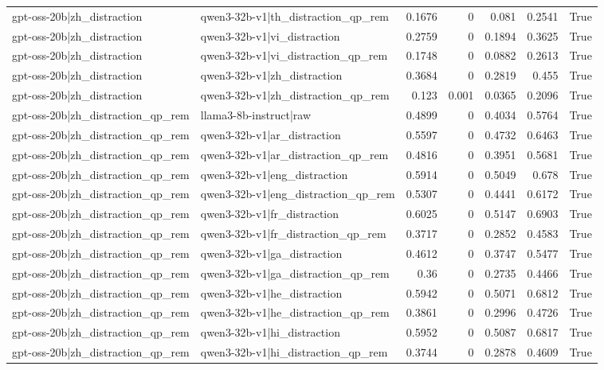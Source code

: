\begin{table}
\begin{tabular}{l l r r r r l}
gpt-oss-20b|zh_distraction & qwen3-32b-v1|th_distraction_qp_rem & 0.1676 & 0 & 0.081 & 0.2541 & True \\
gpt-oss-20b|zh_distraction & qwen3-32b-v1|vi_distraction & 0.2759 & 0 & 0.1894 & 0.3625 & True \\
gpt-oss-20b|zh_distraction & qwen3-32b-v1|vi_distraction_qp_rem & 0.1748 & 0 & 0.0882 & 0.2613 & True \\
gpt-oss-20b|zh_distraction & qwen3-32b-v1|zh_distraction & 0.3684 & 0 & 0.2819 & 0.455 & True \\
gpt-oss-20b|zh_distraction & qwen3-32b-v1|zh_distraction_qp_rem & 0.123 & 0.001 & 0.0365 & 0.2096 & True \\
gpt-oss-20b|zh_distraction_qp_rem & llama3-8b-instruct|raw & 0.4899 & 0 & 0.4034 & 0.5764 & True \\
gpt-oss-20b|zh_distraction_qp_rem & qwen3-32b-v1|ar_distraction & 0.5597 & 0 & 0.4732 & 0.6463 & True \\
gpt-oss-20b|zh_distraction_qp_rem & qwen3-32b-v1|ar_distraction_qp_rem & 0.4816 & 0 & 0.3951 & 0.5681 & True \\
gpt-oss-20b|zh_distraction_qp_rem & qwen3-32b-v1|eng_distraction & 0.5914 & 0 & 0.5049 & 0.678 & True \\
gpt-oss-20b|zh_distraction_qp_rem & qwen3-32b-v1|eng_distraction_qp_rem & 0.5307 & 0 & 0.4441 & 0.6172 & True \\
gpt-oss-20b|zh_distraction_qp_rem & qwen3-32b-v1|fr_distraction & 0.6025 & 0 & 0.5147 & 0.6903 & True \\
gpt-oss-20b|zh_distraction_qp_rem & qwen3-32b-v1|fr_distraction_qp_rem & 0.3717 & 0 & 0.2852 & 0.4583 & True \\
gpt-oss-20b|zh_distraction_qp_rem & qwen3-32b-v1|ga_distraction & 0.4612 & 0 & 0.3747 & 0.5477 & True \\
gpt-oss-20b|zh_distraction_qp_rem & qwen3-32b-v1|ga_distraction_qp_rem & 0.36 & 0 & 0.2735 & 0.4466 & True \\
gpt-oss-20b|zh_distraction_qp_rem & qwen3-32b-v1|he_distraction & 0.5942 & 0 & 0.5071 & 0.6812 & True \\
gpt-oss-20b|zh_distraction_qp_rem & qwen3-32b-v1|he_distraction_qp_rem & 0.3861 & 0 & 0.2996 & 0.4726 & True \\
gpt-oss-20b|zh_distraction_qp_rem & qwen3-32b-v1|hi_distraction & 0.5952 & 0 & 0.5087 & 0.6817 & True \\
gpt-oss-20b|zh_distraction_qp_rem & qwen3-32b-v1|hi_distraction_qp_rem & 0.3744 & 0 & 0.2878 & 0.4609 & True \\

\end{tabular}
\end{table}
